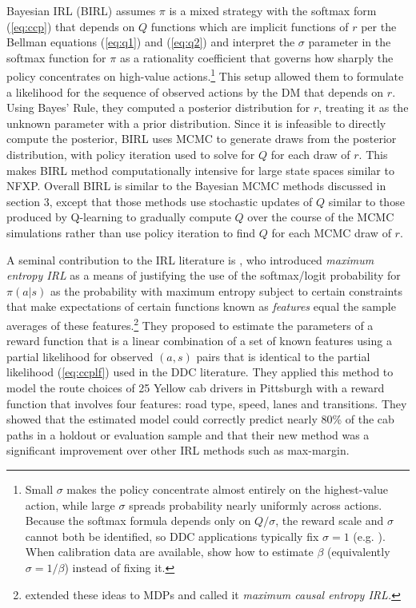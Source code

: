 Bayesian IRL (BIRL) \citep{birl:2007} assumes $\pi$ is a mixed strategy with the softmax
form (\ref{eq:ccp}) that depends on $Q$ functions which are implicit functions of $r$ per the Bellman equations (\ref{eq:q1}) and
(\ref{eq:q2}) and interpret the $\sigma$ parameter in the softmax function for $\pi$ as a rationality coefficient that governs how sharply the policy concentrates on high-value actions.\footnote{\footnotesize Small $\sigma$ makes the policy concentrate almost entirely on the highest-value action, while large $\sigma$ spreads probability nearly uniformly across actions. Because the softmax formula depends only on $Q/\sigma$, the reward scale and $\sigma$ cannot both be identified, so DDC applications typically fix $\sigma=1$ (e.g. \citet{AE:2022}). When calibration data are available, \citet{ghosal:2023} show how to estimate $\beta$ (equivalently $\sigma=1/\beta$) instead of fixing it.} This setup allowed them to formulate a likelihood for the sequence of observed actions by
the DM that depends on $r$. Using  Bayes' Rule, they computed a posterior distribution for $r$, treating it as the unknown parameter
with a prior distribution. Since it is infeasible to directly compute the
posterior,  BIRL uses MCMC to generate draws from the posterior
distribution, with policy iteration used to solve for $Q$ for each draw of $r$. This makes BIRL method computationally intensive
for large state spaces similar to NFXP. Overall BIRL is similar to the Bayesian MCMC methods discussed in section 3, except that those
methods use stochastic updates of $Q$ similar to those produced by Q-learning to gradually compute $Q$ over the course
of the MCMC simulations rather than use policy iteration to find $Q$ for each MCMC draw of $r$.

A seminal contribution to the IRL literature is
\citet{ziebart:2008}, who introduced {\it maximum entropy IRL\/} as a means of justifying the use of the softmax/logit
probability for  $\pi(a|s)$ as the probability with maximum entropy subject to certain constraints that make
expectations of certain functions known as {\it features\/} equal the sample averages of these features.\footnote{\footnotesize
\citet{ziebart:2010} extended these ideas to MDPs and called it {\it maximum causal entropy IRL.\/}}
They proposed to estimate the parameters of a reward function that is a linear
combination of a set of known features using a partial likelihood for observed $(a,s)$ pairs
that is identical to the partial likelihood (\ref{eq:ccplf}) used in the DDC literature.
They applied this method to model the route choices of 25 Yellow cab drivers in Pittsburgh with a reward
function that involves four features: road type, speed, lanes and transitions. They showed that the estimated
model could correctly predict nearly 80\% of the cab paths in a holdout or evaluation sample and that
their new method was a significant improvement over other IRL methods such as max-margin.

